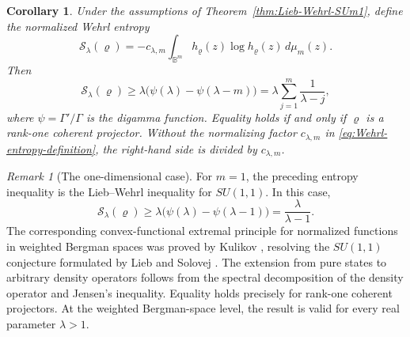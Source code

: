 \documentclass[11pt,reqno]{amsart}
\numberwithin{equation}{section}
\newtheorem{corollary}[theorem]{Corollary}
\theoremstyle{definition}
\theoremstyle{remark}
\newtheorem{remark}[theorem]{Remark}
\begin{document}
\begin{corollary}
\label{cor:Lieb-Wehrl-entropy}
Under the assumptions of Theorem~\ref{thm:Lieb-Wehrl-SUm1}, define the
normalized Wehrl entropy
\begin{equation}
 \mathcal S_\lambda(\varrho)
 =-c_{\lambda,m}\int_{\mathbb B^m}
 h_\varrho(z)\log h_\varrho(z)\,d\mu_m(z).
 \label{eq:Wehrl-entropy-definition}
\end{equation}
Then
\begin{equation}
 \mathcal S_\lambda(\varrho)
 \ge
 \lambda\bigl(\psi(\lambda)-\psi(\lambda-m)\bigr)
 =\lambda\sum_{j=1}^{m}\frac{1}{\lambda-j},
 \label{eq:Wehrl-entropy-bound}
\end{equation}
where $\psi=\Gamma'/\Gamma$ is the digamma function.  Equality holds if and
only if $\varrho$ is a rank-one coherent projector.  Without the normalizing factor
$c_{\lambda,m}$ in \eqref{eq:Wehrl-entropy-definition}, the right-hand side is
divided by $c_{\lambda,m}$.
\end{corollary}
\begin{remark}[The one-dimensional case]
For \(m=1\), the preceding entropy inequality is the
Lieb--Wehrl inequality for \(SU(1,1)\). In this case,
\[
\mathcal S_\lambda(\varrho)
\ge
\lambda\bigl(\psi(\lambda)-\psi(\lambda-1)\bigr)
=
\frac{\lambda}{\lambda-1}.
\]
The corresponding convex-functional extremal principle for normalized
functions in weighted Bergman spaces was proved by Kulikov
\cite{Kulikov2022}, resolving the \(SU(1,1)\) conjecture formulated by
Lieb and Solovej \cite{LiebSolovej2021}. The extension from pure states
to arbitrary density operators follows from the spectral decomposition
of the density operator and Jensen's inequality. Equality holds precisely
for rank-one coherent projectors. At the weighted Bergman-space level,
the result is valid for every real parameter \(\lambda>1\).
\end{remark}
\end{document}
